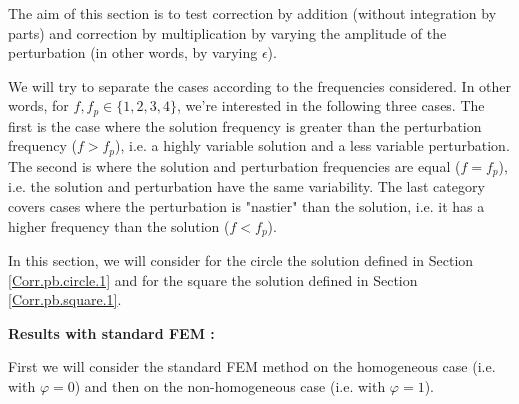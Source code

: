 The aim of this section is to test correction by addition (without integration by parts) and correction by multiplication by varying the amplitude of the perturbation (in other words, by varying $\epsilon$). 

We will try to separate the cases according to the frequencies considered. In other words, for $f,f_p\in\{1,2,3,4\}$, we're interested in the following three cases. The first is the case where the solution frequency is greater than the perturbation frequency ($f>f_p$), i.e. a highly variable solution and a less variable perturbation. The second is where the solution and perturbation frequencies are equal ($f=f_p$), i.e. the solution and perturbation have the same variability. The last category covers cases where the perturbation is "nastier" than the solution, i.e. it has a higher frequency than the solution ($f<f_p$). 

In this section, we will consider for the circle the solution defined in Section \ref{Corr.pb.circle.1} and for the square the solution defined in Section \ref{Corr.pb.square.1}.

\textbf{Results with standard FEM :}

First we will consider the standard FEM method on the homogeneous case (i.e. with $\varphi=0$) and then on the non-homogeneous case (i.e. with $\varphi=1$).


